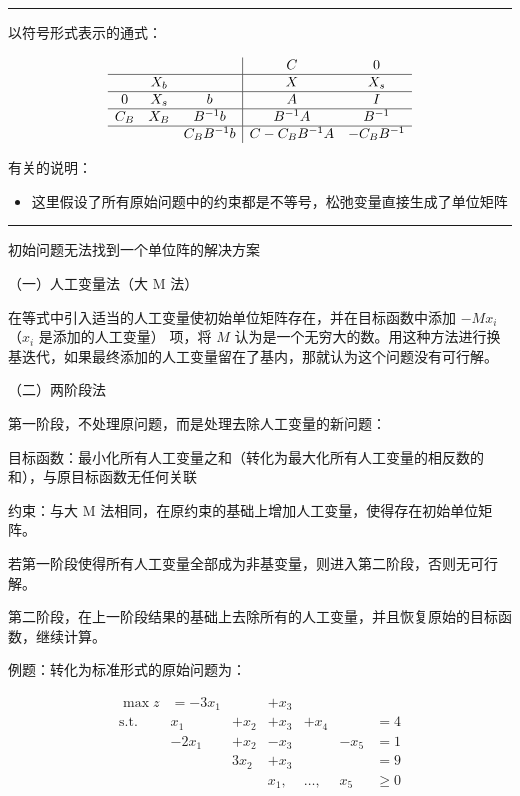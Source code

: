 \documentclass[UTF8, 6pt]{ctexart}
\newcommand{\st}{\text{s.t.}}
\newcommand{\mcompress}{\vspace{-10 px}}
\newcommand{\sectionline}{\rule[2pt]{0.45\textwidth}{0.05em}}
\begin{document}
\sectionline

以符号形式表示的通式：

\mcompress
\[
\begin{array}{ccc|cc}
	    &     &            &      C       &     0      \\\hline
	    & X_b &            &      X       &    X_s     \\ \hline
	 0  & X_s &     b      &      A       &     I      \\ \hline
	C_B & X_B &  B^{-1}b   &   B^{-1}A    &   B^{-1}   \\ \hline
	    &     & C_BB^{-1}b & C-C_BB^{-1}A & -C_BB^{-1}
\end{array}
\]
\mcompress

有关的说明：

\begin{itemize}
	\item 这里假设了所有原始问题中的约束都是不等号，松弛变量直接生成了单位矩阵
\end{itemize}

\sectionline

初始问题无法找到一个单位阵的解决方案

（一）人工变量法（大 M 法）

在等式中引入适当的人工变量使初始单位矩阵存在，并在目标函数中添加 $-M x_i$ （$x_i$ 是添加的人工变量） 项，将 $M$ 认为是一个无穷大的数。用这种方法进行换基迭代，如果最终添加的人工变量留在了基内，那就认为这个问题没有可行解。


（二）两阶段法

第一阶段，不处理原问题，而是处理去除人工变量的新问题：

目标函数：最小化所有人工变量之和（转化为最大化所有人工变量的相反数的和），与原目标函数无任何关联

约束：与大 M 法相同，在原约束的基础上增加人工变量，使得存在初始单位矩阵。

若第一阶段使得所有人工变量全部成为非基变量，则进入第二阶段，否则无可行解。

第二阶段，在上一阶段结果的基础上去除所有的人工变量，并且恢复原始的目标函数，继续计算。

例题：转化为标准形式的原始问题为：

\mcompress
\[
\begin{array}{lrrrrrl}
	\max z & =-3x_1 &      & +x_3 &         &      &        \\
	\st    &    x_1 & +x_2 & +x_3 &    +x_4 &      & =4     \\
	       &  -2x_1 & +x_2 & -x_3 &         & -x_5 & =1     \\
	       &        & 3x_2 & +x_3 &         &      & =9     \\
	       &        &      & x_1, & \ldots, &  x_5 & \geq 0
\end{array}
\]
\mcompress
\end{document}
